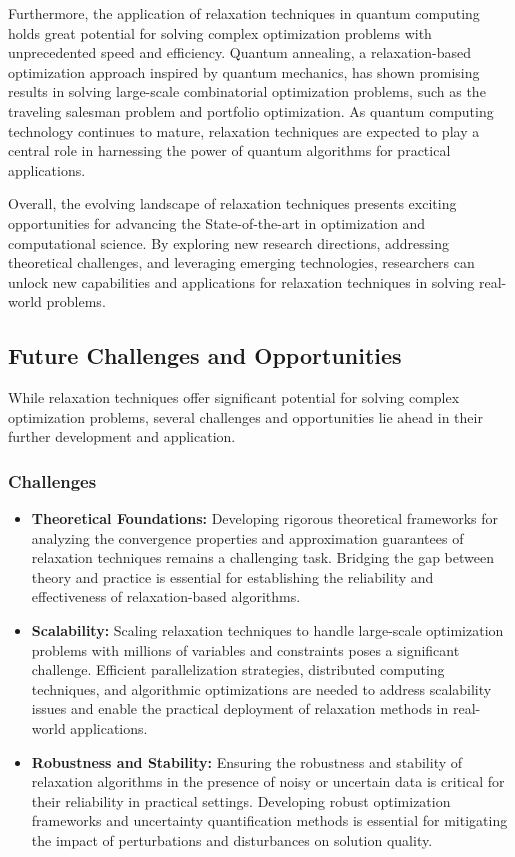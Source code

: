 \documentclass[12pt]{book} %
\begin{document}
Furthermore, the application of relaxation techniques in quantum computing holds great potential for solving complex optimization problems with unprecedented speed and efficiency. Quantum annealing, a relaxation-based optimization approach inspired by quantum mechanics, has shown promising results in solving large-scale combinatorial optimization problems, such as the traveling salesman problem and portfolio optimization. As quantum computing technology continues to mature, relaxation techniques are expected to play a central role in harnessing the power of quantum algorithms for practical applications.

Overall, the evolving landscape of relaxation techniques presents exciting opportunities for advancing the State-of-the-art in optimization and computational science. By exploring new research directions, addressing theoretical challenges, and leveraging emerging technologies, researchers can unlock new capabilities and applications for relaxation techniques in solving real-world problems.

\subsection{Future Challenges and Opportunities}

While relaxation techniques offer significant potential for solving complex optimization problems, several challenges and opportunities lie ahead in their further development and application. 

\subsubsection{Challenges}

\begin{itemize}
    \item \textbf{Theoretical Foundations:} Developing rigorous theoretical frameworks for analyzing the convergence properties and approximation guarantees of relaxation techniques remains a challenging task. Bridging the gap between theory and practice is essential for establishing the reliability and effectiveness of relaxation-based algorithms.
    
    \item \textbf{Scalability:} Scaling relaxation techniques to handle large-scale optimization problems with millions of variables and constraints poses a significant challenge. Efficient parallelization strategies, distributed computing techniques, and algorithmic optimizations are needed to address scalability issues and enable the practical deployment of relaxation methods in real-world applications.
    
    \item \textbf{Robustness and Stability:} Ensuring the robustness and stability of relaxation algorithms in the presence of noisy or uncertain data is critical for their reliability in practical settings. Developing robust optimization frameworks and uncertainty quantification methods is essential for mitigating the impact of perturbations and disturbances on solution quality.
\end{itemize}
\end{document}
